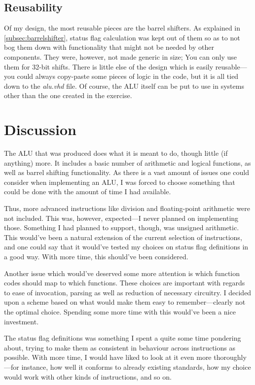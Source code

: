 \documentclass{article}
\begin{document}
\subsection{Reusability}
\label{subsec:reusability}
Of my design, the most reusable pieces are the barrel shifters. As explained in \autoref{subsec:barrelshifter}, status flag calculation was kept out of them so as to not bog them down with functionality that might not be needed by other components. They were, however, not made generic in size; You can only use them for 32-bit shifts. There is little else of the design which is easily reusable---you could always copy-paste some pieces of logic in the code, but it is all tied down to the {\em alu.vhd} file. Of course, the ALU itself can be put to use in systems other than the one created in the exercise.


\section{Discussion}
\label{sec:discussion}
The ALU that was produced does what it is meant to do, though little (if anything) more. It includes a basic number of arithmetic and logical functions, as well as barrel shifting functionality. As there is a vast amount of issues one could consider when implementing an ALU, I was forced to choose something that could be done with the amount of time I had available. 

Thus, more advanced instructions like division and floating-point arithmetic were not included. This was, however, expected---I never planned on implementing those. Something I had planned to support, though, was unsigned arithmetic. This would've been a natural extension of the current selection of instructions, and one could say that it would've tested my choices on status flag definitions in a good way. With more time, this should've been considered.

Another issue which would've deserved some more attention is which function codes should map to which functions. These choices are important with regards to ease of invocation, parsing as well as reduction of necessary circuitry. I decided upon a scheme based on what would make them easy to remember---clearly not the optimal choice. Spending some more time with this would've been a nice investment.

The status flag definitions was something I spent a quite some time pondering about, trying to make them as consistent in behaviour across instructions as possible. With more time, I would have liked to look at it even more thoroughly---for instance, how well it conforms to already existing standards, how my choice would work with other kinds of instructions, and so on.
\end{document}
